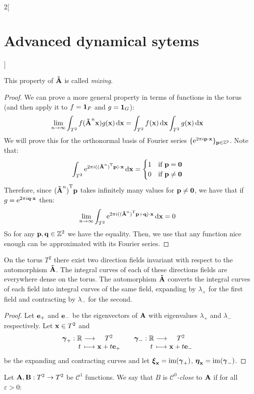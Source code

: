 \documentclass[../../../main_math.tex]{subfiles}
\begin{document}
\begin{multicols}{2}[\section{Advanced dynamical sytems}]
\begin{theorem}
$$    $$
    This property of $\boldsymbol{\mathrm{\tilde{A}}}$ is called \emph{mixing}.
  \end{theorem}
  \begin{proof}
    We can prove a more general property in terms of functions in the torus (and then apply it to $f=\boldsymbol{\mathrm{1}}_{F}$ and $g=\boldsymbol{\mathrm{1}}_{G}$):
    $$
      \lim_{n\to\infty}\int_{T^2} f(\boldsymbol{\mathrm{\tilde{A}}}^n \boldsymbol{\mathrm{x}}) g(\boldsymbol{\mathrm{x}})\dd{\boldsymbol{\mathrm{x}}}=\int_{T^2} f(\boldsymbol{\mathrm{x}})\dd{\boldsymbol{\mathrm{x}}}\int_{T^2} g(\boldsymbol{\mathrm{x}})\dd{\boldsymbol{\mathrm{x}}}
    $$
    We will prove this for the orthonormal basis of Fourier series $\{\mathrm{e}^{2\pi i \boldsymbol{\mathrm{p}}\cdot \boldsymbol{\mathrm{x}}}\}_{\boldsymbol{\mathrm{p}}\in\mathbb{Z}^2}$. Note that:
    $$
      \int_{T^2} \mathrm{e}^{2\pi i ({(\boldsymbol{\mathrm{\tilde{A}}}^n)}^{\mathrm{T}}\boldsymbol{\mathrm{p}})\cdot \boldsymbol{\mathrm{x}}}\dd{\boldsymbol{\mathrm{x}}}=\begin{cases}
        1 & \text{if }\boldsymbol{\mathrm{p}}=\boldsymbol{\mathrm{0}}    \\
        0 & \text{if }\boldsymbol{\mathrm{p}}\ne \boldsymbol{\mathrm{0}}
      \end{cases}
    $$
    Therefore, since ${(\boldsymbol{\mathrm{\tilde{A}}}^n)}^{\mathrm{T}}\boldsymbol{\mathrm{p}}$ takes infinitely many values for $\boldsymbol{\mathrm{p}}\ne \boldsymbol{\mathrm{0}}$, we have that if $g=\mathrm{e}^{2\pi i \boldsymbol{\mathrm{q}} \cdot \boldsymbol{\mathrm{x}}}$ then:
    $$
      \lim_{n\to\infty}\int_{T^2} \mathrm{e}^{2\pi i({(\boldsymbol{\mathrm{\tilde{A}}}^n)}^{\mathrm{T}}\boldsymbol{\mathrm{p}}+\boldsymbol{\mathrm{q}})\cdot \boldsymbol{\mathrm{x}}}\dd{\boldsymbol{\mathrm{x}}}=0
    $$
    So for any $\boldsymbol{\mathrm{p}}, \boldsymbol{\mathrm{q}}\in\mathbb{Z}^2$ we have the equality. Then, we use that any function nice enough can be approximated with its Fourier series.
  \end{proof}
  \begin{theorem}
    On the torus $T^2$ there exist two direction fields invariant with respect to the automorphism $\boldsymbol{\mathrm{\tilde{A}}}$. The integral curves of each of these directions fields are everywhere dense on the torus. The automorphism $\boldsymbol{\mathrm{\tilde{A}}}$ converts the integral curves of each field into integral curves of the same field, expanding by $\lambda_+$ for the first field and contracting by $\lambda_-$ for the second.
  \end{theorem}
  \begin{proof}
    Let $\boldsymbol{\mathrm{e}}_+$ and $\boldsymbol{\mathrm{e}}_-$ be the eigenvectors of $\boldsymbol{\mathrm{A}}$ with eigenvalues $\lambda_+$ and $\lambda_-$ respectively. Let $\boldsymbol{\mathrm{x}}\in T^2$ and
    $$
      \function{\vf\gamma_+}{\RR}{T^2}{t}{\vf{x}+t \vf{e}_+}\quad
      \function{\vf\gamma_-}{\RR}{T^2}{t}{\vf{x}+t \vf{e}_-}
    $$
    be the expanding and contracting curves and let $\boldsymbol{\mathrm{\xi}}_{\boldsymbol{\mathrm{x}}}=\operatorname{im}(\boldsymbol{\mathrm{\gamma}}_+)$, $\boldsymbol{\mathrm{\eta}}_{\boldsymbol{\mathrm{x}}}=\operatorname{im}(\boldsymbol{\mathrm{\gamma}}_-)$.
  \end{proof}
  \begin{definition}
    Let $\boldsymbol{\mathrm{A}},\boldsymbol{\mathrm{B}}:T^2\rightarrow T^2$ be $\mathcal{C}^1$ functions. We say that $B$ is \emph{$\mathcal{C}^0$-close} to $\boldsymbol{\mathrm{A}}$ if for all $\varepsilon>0$:

\end{definition}
\end{multicols}
\end{document}
